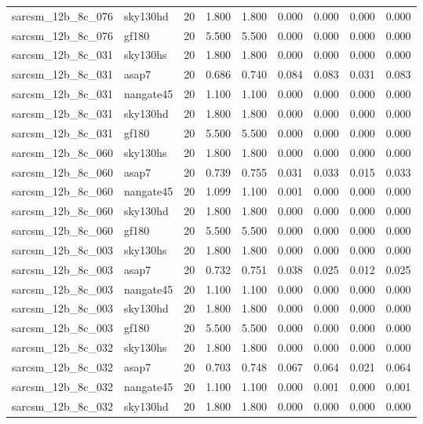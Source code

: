 \begin{tabular}{llrrrrrrr}
sarcsm\_12b\_8c\_076 & sky130hd & 20 & 1.800 & 1.800 & 0.000 & 0.000 & 0.000 & 0.000 \\
sarcsm\_12b\_8c\_076 & gf180 & 20 & 5.500 & 5.500 & 0.000 & 0.000 & 0.000 & 0.000 \\
sarcsm\_12b\_8c\_031 & sky130hs & 20 & 1.800 & 1.800 & 0.000 & 0.000 & 0.000 & 0.000 \\
sarcsm\_12b\_8c\_031 & asap7 & 20 & 0.686 & 0.740 & 0.084 & 0.083 & 0.031 & 0.083 \\
sarcsm\_12b\_8c\_031 & nangate45 & 20 & 1.100 & 1.100 & 0.000 & 0.000 & 0.000 & 0.000 \\
sarcsm\_12b\_8c\_031 & sky130hd & 20 & 1.800 & 1.800 & 0.000 & 0.000 & 0.000 & 0.000 \\
sarcsm\_12b\_8c\_031 & gf180 & 20 & 5.500 & 5.500 & 0.000 & 0.000 & 0.000 & 0.000 \\
sarcsm\_12b\_8c\_060 & sky130hs & 20 & 1.800 & 1.800 & 0.000 & 0.000 & 0.000 & 0.000 \\
sarcsm\_12b\_8c\_060 & asap7 & 20 & 0.739 & 0.755 & 0.031 & 0.033 & 0.015 & 0.033 \\
sarcsm\_12b\_8c\_060 & nangate45 & 20 & 1.099 & 1.100 & 0.001 & 0.000 & 0.000 & 0.000 \\
sarcsm\_12b\_8c\_060 & sky130hd & 20 & 1.800 & 1.800 & 0.000 & 0.000 & 0.000 & 0.000 \\
sarcsm\_12b\_8c\_060 & gf180 & 20 & 5.500 & 5.500 & 0.000 & 0.000 & 0.000 & 0.000 \\
sarcsm\_12b\_8c\_003 & sky130hs & 20 & 1.800 & 1.800 & 0.000 & 0.000 & 0.000 & 0.000 \\
sarcsm\_12b\_8c\_003 & asap7 & 20 & 0.732 & 0.751 & 0.038 & 0.025 & 0.012 & 0.025 \\
sarcsm\_12b\_8c\_003 & nangate45 & 20 & 1.100 & 1.100 & 0.000 & 0.000 & 0.000 & 0.000 \\
sarcsm\_12b\_8c\_003 & sky130hd & 20 & 1.800 & 1.800 & 0.000 & 0.000 & 0.000 & 0.000 \\
sarcsm\_12b\_8c\_003 & gf180 & 20 & 5.500 & 5.500 & 0.000 & 0.000 & 0.000 & 0.000 \\
sarcsm\_12b\_8c\_032 & sky130hs & 20 & 1.800 & 1.800 & 0.000 & 0.000 & 0.000 & 0.000 \\
sarcsm\_12b\_8c\_032 & asap7 & 20 & 0.703 & 0.748 & 0.067 & 0.064 & 0.021 & 0.064 \\
sarcsm\_12b\_8c\_032 & nangate45 & 20 & 1.100 & 1.100 & 0.000 & 0.001 & 0.000 & 0.001 \\
sarcsm\_12b\_8c\_032 & sky130hd & 20 & 1.800 & 1.800 & 0.000 & 0.000 & 0.000 & 0.000 \\

\end{tabular}
